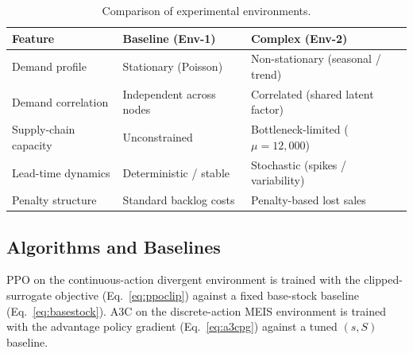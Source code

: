 \documentclass[letterpaper]{article} %
\begin{document}
\begin{table}[t]
\centering
\caption{Comparison of experimental environments.}
\label{tab:stressors}
\footnotesize
\setlength{\tabcolsep}{4pt}
\begin{tabular}{@{}p{}p{}p{}@{}}
\toprule
\textbf{Feature}      & \textbf{Baseline (Env-1)}  & \textbf{Complex (Env-2)}             \\
\midrule
Demand profile        & Stationary (Poisson)       & Non-stationary (seasonal / trend)    \\
Demand correlation    & Independent across nodes   & Correlated (shared latent factor)    \\
Supply-chain capacity & Unconstrained              & Bottleneck-limited ($\mu{=}12{,}000$)\\
Lead-time dynamics    & Deterministic / stable     & Stochastic (spikes / variability)    \\
Penalty structure     & Standard backlog costs     & Penalty-based lost sales             \\
\bottomrule
\end{tabular}
\end{table}

\subsection{Algorithms and Baselines}
PPO on the continuous-action divergent environment is trained
with the clipped-surrogate objective (Eq.~\ref{eq:ppoclip}) against
a fixed base-stock baseline (Eq.~\ref{eq:basestock}). 
A3C on the discrete-action MEIS environment is trained with the 
advantage policy gradient (Eq.~\ref{eq:a3cpg}) against a tuned $(s,S)$ baseline.
\end{document}
